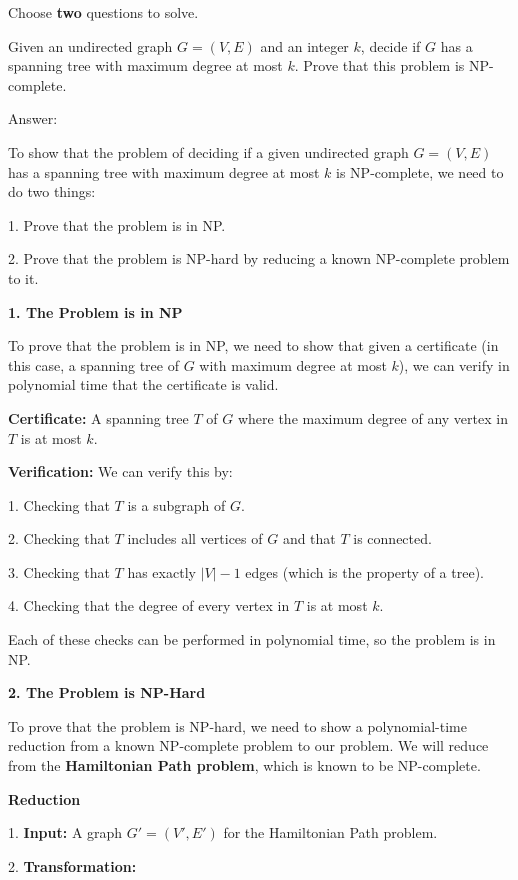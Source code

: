 \documentclass{oxmathproblems}
\begin{document}
Choose \textbf{two} questions to solve.

\begin{questions}
\miquestion[50] 
Given an undirected graph $G=(V,E)$ and an integer $k$, decide if $G$ has a spanning tree with maximum degree at most $k$. Prove that this problem is NP-complete.

Answer:

To show that the problem of deciding if a given undirected graph \( G = (V, E) \) has a spanning tree with maximum degree at most \( k \) is NP-complete, we need to do two things:

1. Prove that the problem is in NP.

2. Prove that the problem is NP-hard by reducing a known NP-complete problem to it.

\textbf{1. The Problem is in NP}

To prove that the problem is in NP, we need to show that given a certificate (in this case, a spanning tree of \( G \) with maximum degree at most \( k \)), we can verify in polynomial time that the certificate is valid.

\textbf{Certificate:} A spanning tree \( T \) of \( G \) where the maximum degree of any vertex in \( T \) is at most \( k \).

\textbf{Verification:} We can verify this by:

  1. Checking that \( T \) is a subgraph of \( G \).
  
  2. Checking that \( T \) includes all vertices of \( G \) and that \( T \) is connected.
  
  3. Checking that \( T \) has exactly \( |V| - 1 \) edges (which is the property of a tree).
  
  4. Checking that the degree of every vertex in \( T \) is at most \( k \).

Each of these checks can be performed in polynomial time, so the problem is in NP.

\textbf{2. The Problem is NP-Hard}

To prove that the problem is NP-hard, we need to show a polynomial-time reduction from a known NP-complete problem to our problem. We will reduce from the \textbf{Hamiltonian Path problem}, which is known to be NP-complete.

\textbf{Reduction}

1. \textbf{Input:} A graph \( G' = (V', E') \) for the Hamiltonian Path problem.

2. \textbf{Transformation:}


\end{questions}
\end{document}
